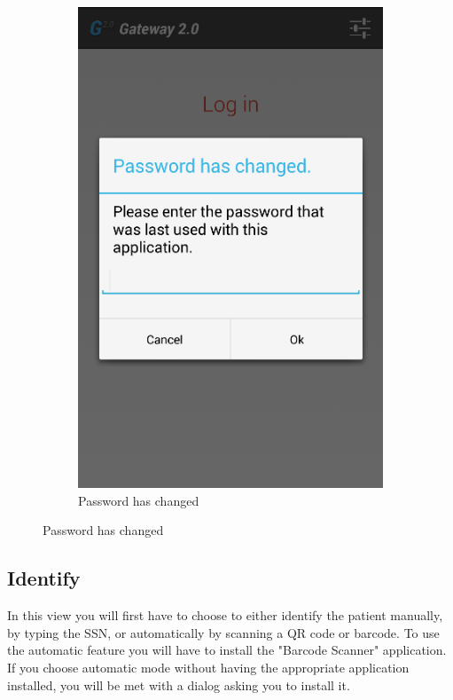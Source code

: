 \begin{figure}[H]
\begin{subfigure}[b]{0.49\textwidth}
        \includegraphics[width=\textwidth]{img/interface/14-DatabasePassword.png}
        \caption*{Password has changed}
        \label{fig:14dbpassword}
    \end{subfigure}
\end{figure}

\newpage
\subsection*{Identify}
In this view you will first have to choose to either identify the patient manually, by typing the SSN, or automatically by scanning a QR code or barcode. To use the automatic feature you will have to install the "Barcode Scanner" application. If you choose automatic mode without having the appropriate application installed, you will be met with a dialog asking you to install it.

